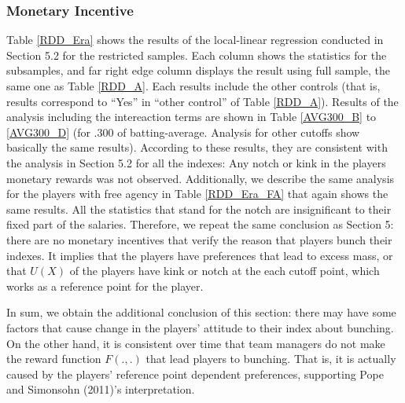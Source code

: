 \documentclass[dvipdfmx, 12pt]{article}
\begin{document}
\subsubsection{Monetary Incentive}

Table \ref{RDD_Era} shows the results of the local-linear regression conducted in Section 5.2 for the restricted samples. Each column shows the statistics for the subsamples, and far right edge column displays the result using full sample, the same one as Table \ref{RDD_A}. Each results include the other controls (that is, results correspond to ``Yes'' in ``other control'' of Table \ref{RDD_A}). Results of the analysis including the intereaction terms are shown in Table \ref{AVG300_B} to \ref{AVG300_D} (for .300 of batting-average. Analysis for other cutoffs show basically the same results). According to these results, they are consistent with the  analysis in Section 5.2 for all the indexes: Any notch or kink in the players monetary rewards was not observed. Additionally, we describe the same analysis for the players with free agency in Table \ref{RDD_Era_FA} that again shows the same results. All the statistics that stand for the notch are insignificant to their fixed part of the salaries. Therefore, we repeat the same conclusion as Section 5: there are no monetary incentives that verify the reason that players bunch their indexes. It implies that the players have preferences that lead to excess mass, or that $U(X)$ of the players have kink or notch at the each cutoff point, which works as a reference point for the player.

In sum, we obtain the additional conclusion of this section: there may have some factors that cause change in the players' attitude to their index about bunching. On the other hand, it is consistent over time that team managers do not make the reward function $F(.,.)$ that lead players to bunching. That is, it is actually caused by the players' reference point dependent preferences, supporting Pope and Simonsohn (2011)'s interpretation.
\end{document}
